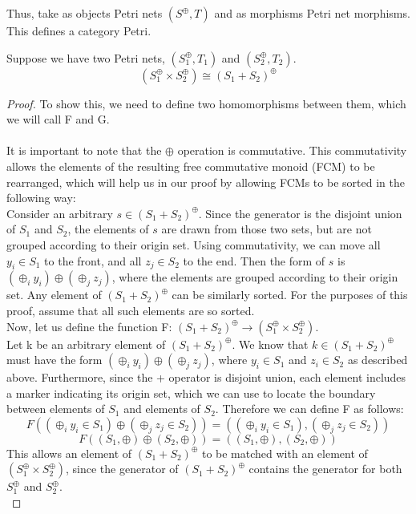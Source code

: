 %
%
Thus, take as objects Petri nets $(S^\oplus, T)$ and as morphisms Petri net morphisms. This defines a category Petri.
\begin{lemma}
Suppose we have two Petri nets, $(S_1^\oplus, T_1)$ and $(S_2^\oplus, T_2)$.\\ 
\[(S_1 ^\oplus \times S_2 ^\oplus) \cong (S_1 + S_2)^\oplus\]
\begin{proof}
To show this, we need to define two homomorphisms between them, which we will call F and G.\\
\bigskip\\
It is important to note that the $\oplus$ operation is commutative. This commutativity allows the elements of the resulting free commutative monoid (FCM) to be rearranged, which will help us in our proof by allowing FCMs to be sorted in the following way:\bigskip\\
Consider an arbitrary $s \in (S_1 + S_2)^\oplus$. Since the generator is the disjoint union of $S_1$ and $S_2$, the elements of $s$ are drawn from those two sets, but are not grouped according to their origin set. Using commutativity, we can move all $y_i \in S_1$ to the front, and all $z_j \in S_2$ to the end. Then the form of $s$ is $(\oplus_i y_i) \oplus (\oplus_j z_j)$, where the elements are grouped according to their origin set. Any element of $(S_1 + S_2)^\oplus$ can be similarly sorted. For the purposes of this proof, assume that all such elements are so sorted.\bigskip \\
Now, let us define the function F: $(S_1 + S_2)^\oplus \to (S_1 ^\oplus \times S_2 ^\oplus)$.\\
Let k be an arbitrary element of $(S_1 + S_2)^\oplus$. We know that $k \in (S_1 + S_2)^\oplus$ must have the form $(\oplus_i y_i) \oplus (\oplus_j z_j)$, where $y_i \in S_1$ and $z_i \in S_2$ as described above. Furthermore, since the + operator is disjoint union, each element includes a marker indicating its origin set, which we can use to locate the boundary between elements of $S_1$ and elements of $S_2$. Therefore we can define F as follows:\\
\[F((\oplus_i y_i \in S_1) \oplus (\oplus_j z_j \in S_2)) = ((\oplus_i y_i \in S_1), (\oplus_j z_j \in S_2))\]
\[F((S_1, \oplus) \oplus (S_2, \oplus)) = ((S_1, \oplus), (S_2, \oplus))\]
This allows an element of $(S_1 + S_2)^\oplus$ to be matched with an element of $(S_1 ^\oplus \times S_2 ^\oplus)$, since the generator of $(S_1 + S_2)^\oplus$ contains the generator for both $S_1^\oplus$ and $S_2^\oplus$.\bigskip\\ 

\end{proof}
\end{lemma}
